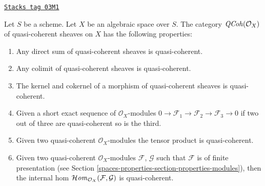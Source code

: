 \begin{lemma}
\label{spaces-properties-lemma-properties-quasi-coherent}
\href{https://stacks.math.columbia.edu/tag/03M1}{\texttt{Stacks tag 03M1}}

Let $S$ be a scheme. Let $X$ be an algebraic space over $S$.
The category $\mathit{QCoh}(\mathcal{O}_X)$ of quasi-coherent sheaves on $X$
has the following properties:
\begin{enumerate}
\item Any direct sum of quasi-coherent sheaves is quasi-coherent.
\item Any colimit of quasi-coherent sheaves is quasi-coherent.
\item The kernel and cokernel of a morphism of quasi-coherent sheaves
is quasi-coherent.
\item Given a short exact sequence of $\mathcal{O}_X$-modules
$0 \to \mathcal{F}_1 \to \mathcal{F}_2 \to \mathcal{F}_3 \to 0$
if two out of three are quasi-coherent so is the third.
\item Given two quasi-coherent $\mathcal{O}_X$-modules
the tensor product is quasi-coherent.
\item Given two quasi-coherent $\mathcal{O}_X$-modules
$\mathcal{F}$, $\mathcal{G}$ such that $\mathcal{F}$
is of finite presentation (see
Section \ref{spaces-properties-section-properties-modules}),
then the internal hom
$\mathcal{H}\mathit{om}_{\mathcal{O}_X}(\mathcal{F}, \mathcal{G})$
is quasi-coherent.
\end{enumerate}
\end{lemma}

